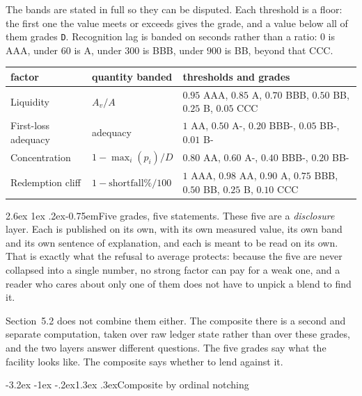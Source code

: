 \documentclass[11pt]{article}
\makeatletter
\renewcommand{\arraystretch}{1.22}
\renewcommand\subsection{\@startsection{subsection}{2}{\z@}%
  {-3.2ex \@plus -1ex \@minus -.2ex}{1.3ex \@plus .3ex}{\normalfont\large\bfseries}}
\renewcommand\paragraph{\@startsection{paragraph}{4}{\z@}%
  {2.6ex \@plus 1ex \@minus .2ex}{-0.75em}{\normalfont\normalsize\bfseries}}
\theoremstyle{orma}
\theoremstyle{ormaupright}
\makeatother
\begin{document}
The bands are stated in full so they can be disputed. Each threshold is a floor: the first
one the value meets or exceeds gives the grade, and a value below all of them grades
\texttt{D}. Recognition lag is banded on seconds rather than a ratio: $0$ is AAA, under $60$
is A, under $300$ is BBB, under $900$ is BB, beyond that CCC.

\begin{center}
\footnotesize
\setlength{\tabcolsep}{7pt}
\renewcommand{\arraystretch}{1.35}
\begin{tabular}{lll}
\toprule
factor & quantity banded & thresholds and grades \\
\midrule
Liquidity & $A_v/A$ &
  $0.95$ AAA, $0.85$ A, $0.70$ BBB, $0.50$ BB, $0.25$ B, $0.05$ CCC \\
First-loss adequacy & adequacy &
  $1$ AA, $0.50$ A-, $0.20$ BBB-, $0.05$ BB-, $0.01$ B- \\
Concentration & $1 - \max_i(p_i)/D$ &
  $0.80$ AA, $0.60$ A-, $0.40$ BBB-, $0.20$ BB- \\
Redemption cliff & $1 - \mathrm{shortfall}\%/100$ &
  $1$ AAA, $0.98$ AA, $0.90$ A, $0.75$ BBB, $0.50$ BB, $0.25$ B, $0.10$ CCC \\
\bottomrule
\end{tabular}
\end{center}

\paragraph{Five grades, five statements.} These five are a \emph{disclosure} layer. Each is
published on its own, with its own measured value, its own band and its own sentence of
explanation, and each is meant to be read on its own. That is exactly what the refusal to
average protects: because the five are never collapsed into a single number, no strong
factor can pay for a weak one, and a reader who cares about only one of them does not have
to unpick a blend to find it.

Section~5.2 does not combine them either. The composite there
is a second and separate computation, taken over raw ledger state rather than over these
grades, and the two layers answer different questions. The five grades say what the facility
looks like. The composite says whether to lend against it.

\subsection{Composite by ordinal notching}
\end{document}
